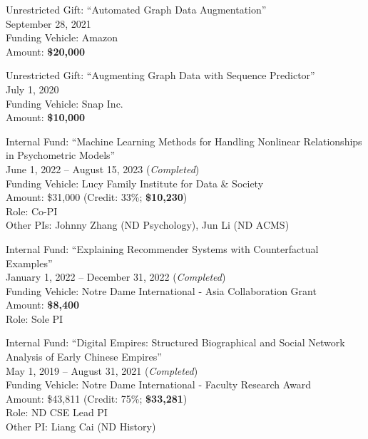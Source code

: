 \documentclass[10pt]{article}
\newenvironment{myindentpar}[1]%
{\begin{list}{}%
         {\setlength{\leftmargin}{#1}}%
         \item[]%
}
{\end{list}}
\newcounter{list}
\begin{document}
\begin{myindentpar}{0.75cm}
\hspace{-0.75cm}Unrestricted Gift: ``Automated Graph Data Augmentation''\\
September 28, 2021 \\
Funding Vehicle: Amazon \\
Amount: \textbf{\$20,000}

\hspace{-0.75cm}Unrestricted Gift: ``Augmenting Graph Data with Sequence Predictor'' \\
July 1, 2020 \\
Funding Vehicle: Snap Inc. \\
Amount: \textbf{\$10,000}

\hspace{-0.75cm}Internal Fund: ``Machine Learning Methods for Handling Nonlinear Relationships in Psychometric Models'' \\
June 1, 2022 -- August 15, 2023 (\emph{Completed}) \\
Funding Vehicle: Lucy Family Institute for Data \& Society \\
Amount: \$31,000 (Credit: 33\%; \textbf{\$10,230}) \\
Role: {Co-PI} \\
Other PIs: Johnny Zhang (ND Psychology), Jun Li (ND ACMS)

\hspace{-0.75cm}Internal Fund: ``Explaining Recommender Systems with Counterfactual Examples''\\
January 1, 2022 -- December 31, 2022 (\emph{Completed}) \\
Funding Vehicle: Notre Dame International - Asia Collaboration Grant \\
Amount: \textbf{\$8,400} \\
Role: {Sole PI}

\hspace{-0.75cm}Internal Fund: ``Digital Empires: Structured Biographical and Social Network Analysis of Early Chinese Empires'' \\
May 1, 2019 -- August 31, 2021 (\emph{Completed}) \\
Funding Vehicle: Notre Dame International - Faculty Research Award \\
Amount: \$43,811 (Credit: 75\%; \textbf{\$33,281}) \\
Role: {ND CSE Lead PI} \\
Other PI: Liang Cai (ND History)

\end{myindentpar}
\end{document}
